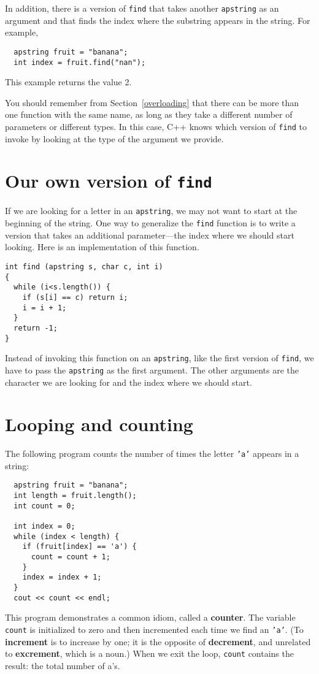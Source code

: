 In addition, there is a
version of {\tt find} that takes another {\tt apstring} as
an argument and that finds the index where the substring
appears in the string.  For example,

\begin{verbatim}
  apstring fruit = "banana";
  int index = fruit.find("nan");
\end{verbatim}
%
This example returns the value 2.

You should remember from Section~\ref{overloading} that there
can be more than one function with the same name, as long as they
take a different number of parameters or different types.  In
this case, C++ knows which version of {\tt find} to invoke
by looking at the type of the argument we provide.

\section{Our own version of {\tt find}}

If we are looking for a letter in an {\tt apstring}, we may
not want to start at the beginning of the string.  One way
to generalize the {\tt find} function is to write a version
that takes an additional parameter---the index where we should
start looking.  Here is an implementation of this function.

\begin{verbatim}
int find (apstring s, char c, int i)
{
  while (i<s.length()) {
    if (s[i] == c) return i;
    i = i + 1;
  }
  return -1;
}
\end{verbatim}
%
Instead of invoking this function on an {\tt apstring}, like
the first version of {\tt find}, we have to pass the {\tt apstring}
as the first argument.  The other arguments are the character
we are looking for and the index where we should start.

\section{Looping and counting}
\label{loopcount}

The following program counts the
number of times the letter {\tt 'a'} appears in a string:

\begin{verbatim}
  apstring fruit = "banana";
  int length = fruit.length();
  int count = 0;

  int index = 0;
  while (index < length) {
    if (fruit[index] == 'a') {
      count = count + 1;
    }
    index = index + 1;
  }
  cout << count << endl;
\end{verbatim}
%
This program demonstrates a common idiom, called a {\bf counter}.  The
variable {\tt count} is initialized to zero and then incremented each
time we find an {\tt 'a'}.  (To {\bf increment} is to increase by one;
it is the opposite of {\bf decrement}, and unrelated to {\bf
excrement}, which is a noun.)  When we exit the loop, {\tt count}
contains the result: the total number of a's.

